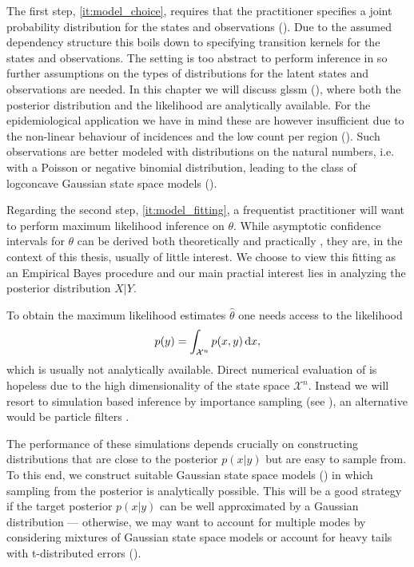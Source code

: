 The first step, \cref{it:model_choice}, requires that the practitioner specifies a joint probability distribution for the states and observations ().
Due to the assumed dependency structure this boils down to specifying transition kernels for the states and observations.
The setting  is too abstract to perform inference in so further assumptions on the types of distributions for the latent states and observations are needed.
In this chapter we will discuss \gls{glssm}  (), where both the posterior distribution and the likelihood are analytically available. For the epidemiological application we have in mind these are however insufficient due to the non-linear behaviour of incidences and the low count per region ().
Such observations are better modeled with distributions on the natural numbers, i.e. with a Poisson or negative binomial distribution, leading to the class of logconcave Gaussian state space models ().

Regarding the second step, \cref{it:model_fitting}, a frequentist practitioner will want to perform maximum likelihood inference on $\theta$.
While asymptotic confidence intervals for $\theta$ can be derived both theoretically and practically \cite[Chapter 7]{Durbin2012Time}, they are, in the context of this thesis, usually of little interest.
We choose to view this fitting as an Empirical Bayes procedure and our main practial interest lies in analyzing the posterior distribution $X|Y$.

To obtain the maximum likelihood estimates $\hat\theta$ one needs access to the likelihood
\begin{align}
    \label{eq:likelihood}
    p(y) = \int_{\mathcal X^n} p(x,y) \,\mathrm d x,
\end{align}
which is usually not analytically available.
Direct numerical evaluation of  is hopeless due to the high dimensionality of the state space $\mathcal X^n$.
Instead we will resort to simulation based inference by importance sampling (see ), an alternative would be particle filters \cite{Chopin2020Introduction}.

The performance of these simulations depends crucially on constructing distributions that are close to the posterior $p(x|y)$ but are easy to sample from. To this end, we construct suitable Gaussian state space models () in which sampling from the posterior is analytically possible.
This will be a good strategy if the target posterior $p(x|y)$ can be well approximated by a Gaussian distribution --- otherwise, we may want to account for multiple modes by considering mixtures of Gaussian state space models or account for heavy tails with t-distributed errors ().

